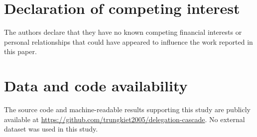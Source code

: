 \documentclass[a4paper,fleqn]{cas-sc}
\begin{document}
\section*{Declaration of competing interest}
The authors declare that they have no known competing financial interests or
personal relationships that could have appeared to influence the work reported
in this paper.

\section*{Data and code availability}
The source code and machine-readable results supporting this study are publicly
available at
\url{https://github.com/trungkiet2005/delegation-cascade}.
No external dataset was used in this study.

\printcredits



\end{document}
